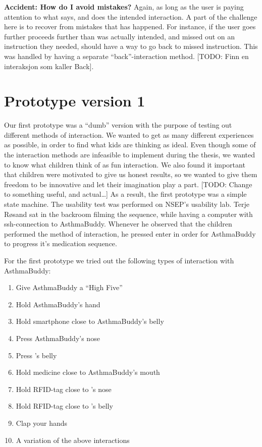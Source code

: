 \textbf{Accident: How do I avoid mistakes?}
Again, as long as the user is paying attention to what \buddy{} says, and does the intended interaction. A part of the challenge here is to recover from mistakes that has happened. For instance, if the user goes further proceeds further than was actually intended, and missed out on an instruction they needed, \buddy{} should have a way to go back to missed instruction. This was handled by having a separate ``back''-interaction method.
[TODO: Finn en interaksjon som kaller Back].   


 

\section{Prototype version 1}
\label{sec:proto1}
Our first prototype was a ``dumb'' version with the purpose of testing out different methods of interaction. We wanted to get as many different experiences as possible, in order to find what kids are thinking as ideal. Even though some of the interaction methods are infeasible to implement during the thesis, we wanted to know what children think of as fun interaction. We also found it important that children were motivated to give us honest results, so we wanted to give them freedom to be innovative and let their imagination play a part.  
[TODO: Change to something useful, and actual\ldots] As a result, the first prototype was a simple state machine. The usability test was performed on NSEP's usability lab. Terje R\o sand sat in the backroom filming the sequence, while having a computer with ssh-connection to AsthmaBuddy. Whenever he observed that the children performed the method of interaction, he pressed enter in order for AsthmaBuddy to progress it's medication sequence. 

For the first prototype we tried out the following types of interaction with AsthmaBuddy:
\begin{enumerate}
	\item{Give AsthmaBuddy a ``High Five''}
	\item{Hold AsthmaBuddy's hand}
	\item{Hold smartphone close to AsthmaBuddy's belly}
	\item{Press AsthmaBuddy's nose}
	\item{Press \buddy{}'s belly}
	\item{Hold medicine close to AsthmaBuddy's mouth}
	\item{Hold RFID-tag close to \buddy{}'s nose}
	\item{Hold RFID-tag close to \buddy{}'s belly}
	\item{Clap your hands}
	\item{A variation of the above interactions}
\end{enumerate}

